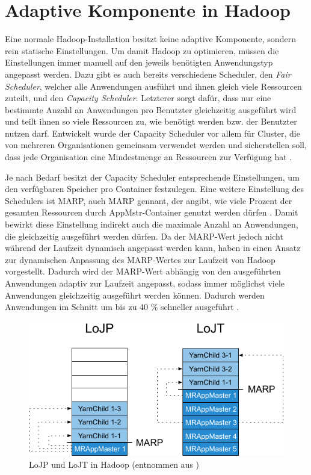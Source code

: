 \section{Adaptive Komponente in Hadoop}\label{sec:inriaSetting}

Eine normale Hadoop-Installation besitzt keine adaptive Komponente, sondern rein statische Einstellungen. Um damit Hadoop zu optimieren, müssen die Einstellungen immer manuell auf den jeweils benötigten Anwendungstyp angepasst werden. Dazu gibt es auch bereits verschiedene Scheduler, den \emph{Fair Scheduler}, welcher alle Anwendungen ausführt und ihnen gleich viele Ressourcen zuteilt, und den \emph{Capacity Scheduler}. Letzterer sorgt dafür, dass nur eine bestimmte Anzahl an Anwendungen pro Benutzter gleichzeitig ausgeführt wird und teilt ihnen so viele Ressourcen zu, wie benötigt werden bzw. der Benutzter nutzen darf. Entwickelt wurde der Capacity Scheduler vor allem für Cluster, die von mehreren Organisationen gemeinsam verwendet werden und sicherstellen soll, dass jede Organisation eine Mindestmenge an Ressourcen zur Verfügung hat \cite{HadoopCapScheduler271}.

Je nach Bedarf besitzt der Capacity Scheduler entsprechende Einstellungen, um \zB den verfügbaren Speicher pro Container festzulegen. Eine weitere Einstellung des Schedulers ist \acl{MARP}, auch \acs{MARP} gennant, der angibt, wie viele Prozent der gesamten Ressourcen durch \ac{AppMstr}-Container genutzt werden dürfen \cite{HadoopCapScheduler271}. Damit bewirkt diese Einstellung indirekt auch die maximale Anzahl an Anwendungen, die gleichzeitig ausgeführt werden dürfen. Da der \ac{MARP}-Wert jedoch nicht während der Laufzeit dynamisch angepasst werden kann, haben \citeauthor{zhang2016} in \cite{zhang2016} einen Ansatz zur dynamischen Anpassung des \ac{MARP}-Wertes zur Laufzeit von Hadoop vorgestellt. Dadurch wird der \ac{MARP}-Wert abhängig von den ausgeführten Anwendungen adaptiv zur Laufzeit angepasst, sodass immer möglichst viele Anwendungen gleichzeitig ausgeführt werden können. Dadurch werden Anwendungen im Schnitt um bis zu 40 \% schneller ausgeführt \cite{zhang2016}.

\begin{figure}
    \centering
    \includegraphics[width=.8\columnwidth]{./images/marpValue.pdf}
    \caption[LoJP und LoJT in Hadoop]{LoJP und LoJT in Hadoop (entnommen aus \cite{zhang2016})}
    \label{fig:marpValue}
\end{figure}

